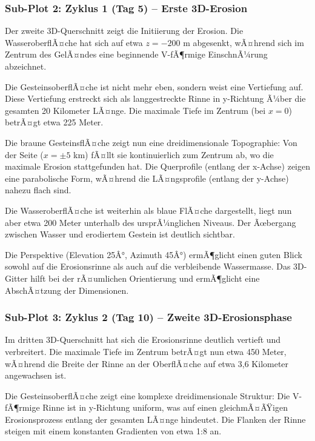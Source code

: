 \subsubsection*{Sub-Plot 2: Zyklus 1 (Tag 5) -- Erste 3D-Erosion}

Der zweite 3D-Querschnitt zeigt die Initiierung der Erosion. Die WasseroberflÃ¤che hat sich auf etwa $z = -200$ m abgesenkt, wÃ¤hrend sich im Zentrum des GelÃ¤ndes eine beginnende V-fÃ¶rmige EinschnÃ¼rung abzeichnet.

Die GesteinsoberflÃ¤che ist nicht mehr eben, sondern weist eine Vertiefung auf. Diese Vertiefung erstreckt sich als langgestreckte Rinne in y-Richtung Ã¼ber die gesamten 20 Kilometer LÃ¤nge. Die maximale Tiefe im Zentrum (bei $x = 0$) betrÃ¤gt etwa 225 Meter.

Die braune GesteinsflÃ¤che zeigt nun eine dreidimensionale Topographie: Von der Seite ($x = \pm 5$ km) fÃ¤llt sie kontinuierlich zum Zentrum ab, wo die maximale Erosion stattgefunden hat. Die Querprofile (entlang der x-Achse) zeigen eine parabolische Form, wÃ¤hrend die LÃ¤ngsprofile (entlang der y-Achse) nahezu flach sind.

Die WasseroberflÃ¤che ist weiterhin als blaue FlÃ¤che dargestellt, liegt nun aber etwa 200 Meter unterhalb des ursprÃ¼nglichen Niveaus. Der Ãœbergang zwischen Wasser und erodiertem Gestein ist deutlich sichtbar.

Die Perspektive (Elevation 25Â°, Azimuth 45Â°) ermÃ¶glicht einen guten Blick sowohl auf die Erosionsrinne als auch auf die verbleibende Wassermasse. Das 3D-Gitter hilft bei der rÃ¤umlichen Orientierung und ermÃ¶glicht eine AbschÃ¤tzung der Dimensionen.

\subsubsection*{Sub-Plot 3: Zyklus 2 (Tag 10) -- Zweite 3D-Erosionsphase}

Im dritten 3D-Querschnitt hat sich die Erosionsrinne deutlich vertieft und verbreitert. Die maximale Tiefe im Zentrum betrÃ¤gt nun etwa 450 Meter, wÃ¤hrend die Breite der Rinne an der OberflÃ¤che auf etwa 3,6 Kilometer angewachsen ist.

Die GesteinsoberflÃ¤che zeigt eine komplexe dreidimensionale Struktur: Die V-fÃ¶rmige Rinne ist in y-Richtung uniform, was auf einen gleichmÃ¤ÃŸigen Erosionsprozess entlang der gesamten LÃ¤nge hindeutet. Die Flanken der Rinne steigen mit einem konstanten Gradienten von etwa 1:8 an.

